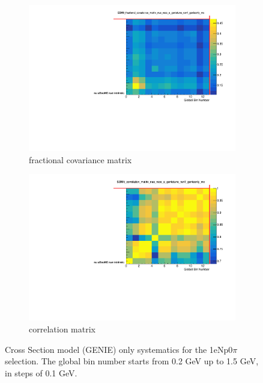 \documentclass[a4paper]{article}
\begin{document}
\begin{figure}[ht] 
\begin{center}
    \begin{subfigure}[b]{0.45\textwidth}
    \centering
    \includegraphics[width=1.00\textwidth]{CovarianceMatrices/SBNfit_fractional_covariance_matrix_nue_reco_e_genietune_run1_genieonly_mc_collapsed.pdf}
    \caption{fractional covariance matrix}
    \end{subfigure}
    \begin{subfigure}[b]{0.45\textwidth}
    \centering
    \includegraphics[width=1.00\textwidth]{CovarianceMatrices/SBNfit_correlation_matrix_nue_reco_e_genietune_run1_genieonly_mc_collapsed.pdf}
    \caption{correlation matrix}
    \end{subfigure}
\caption{\label{fig:geniematrices} Cross Section model (GENIE) only systematics for the 1eNp0$\pi$ selection. The global bin number starts from 0.2 GeV up to 1.5 GeV, in steps of 0.1 GeV.}
\end{center}
\end{figure}
\end{document}

